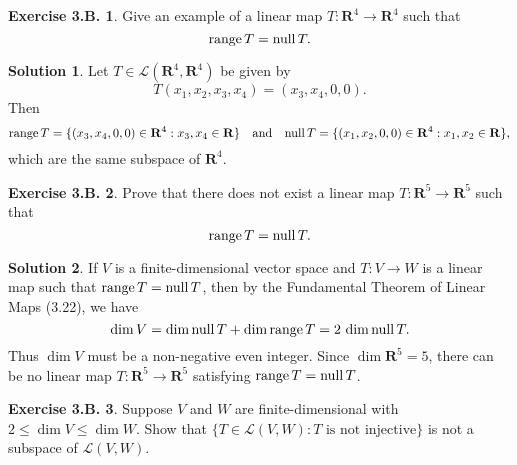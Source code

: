 \documentclass[12pt]{article}
\theoremstyle{definition}
\theoremstyle{exercise}
\newtheorem{exercise}{Exercise 3.B.}
\theoremstyle{solution}
\newtheorem*{solution}{Solution}
\newcommand{\lmap}{\mathcal{L}}
\newcommand{\Null}{\text{null\,}}
\newcommand{\Range}{\text{range\,}}
\newcommand{\quand}{\quad \text{and} \quad}
\newcommand{\R}{\mathbf{R}}
\begin{document}
\begin{exercise}
\label{ex:5}
    Give an example of a linear map \( T : \R^4 \to \R^4 \) such that
    \[
        \Range T = \Null T.
    \]
\end{exercise}

\begin{solution}
    Let \( T \in \lmap(\R^4, \R^4) \) be given by
    \[
        T(x_1, x_2, x_3, x_4) = (x_3, x_4, 0, 0).
    \]
    Then
    \[
        \Range T = \{ (x_3, x_4, 0, 0) \in \R^4 : x_3, x_4 \in \R \} \quand \Null T = \{ (x_1, x_2, 0, 0) \in \R^4 : x_1, x_2 \in \R \},
    \]
    which are the same subspace of \( \R^4 \).
\end{solution}

\begin{exercise}
\label{ex:6}
    Prove that there does not exist a linear map \( T : \R^5 \to \R^5 \) such that
    \[
        \Range T = \Null T.
    \]
\end{exercise}

\begin{solution}
    If \( V \) is a finite-dimensional vector space and \( T : V \to W \) is a linear map such that \( \Range T = \Null T \), then by the Fundamental Theorem of Linear Maps (3.22), we have
    \[
        \dim V = \dim \Null T + \dim \Range T = 2 \, \dim \Null T.
    \]
    Thus \( \dim V \) must be a non-negative even integer. Since \( \dim \R^5 = 5 \), there can be no linear map \( T : \R^5 \to \R^5 \) satisfying \( \Range T = \Null T \).
\end{solution}

\begin{exercise}
\label{ex:7}
    Suppose \( V \) and \( W \) are finite-dimensional with \( 2 \leq \dim V \leq \dim W \). Show that \( \{ T \in \lmap(V, W) : T \text{ is not injective} \} \) is not a subspace of \( \lmap(V, W) \).
\end{exercise}
\end{document}
